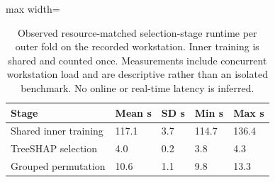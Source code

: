\begin{table}[htbp]
\centering\small
\caption{Observed resource-matched selection-stage runtime per outer fold on the recorded workstation. Inner training is shared and counted once. Measurements include concurrent workstation load and are descriptive rather than an isolated benchmark. No online or real-time latency is inferred.}\label{tab:costs}
\begin{adjustbox}{max width=\textwidth}
\begin{tabular}{lllll}\toprule
Stage & Mean s & SD s & Min s & Max s\\\midrule
Shared inner training & 117.1 & 3.7 & 114.7 & 136.4\\
TreeSHAP selection & 4.0 & 0.2 & 3.8 & 4.3\\
Grouped permutation & 10.6 & 1.1 & 9.8 & 13.3\\
\bottomrule\end{tabular}
\end{adjustbox}
\end{table}
